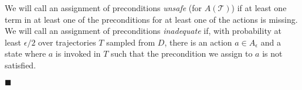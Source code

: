 \documentclass[letterpaper]{article}
\newenvironment{proof}{\noindent{\bf Proof:~~}}{\qed}
\newcommand{\qed}{\hfill\ensuremath{\blacksquare}}
\begin{document}
\begin{proof}


We will call an assignment of preconditions {\em unsafe} (for $A(\mathcal{T})$) if at least one term in at least one of the preconditions for at least one of the actions is missing. We will call an assignment of preconditions {\em inadequate} if, with probability at least $\epsilon/2$ over trajectories $T$ sampled from $D$, there is an action $a\in A_\epsilon$ and a state where $a$ is invoked in $T$ such that the precondition we assign to $a$ is not satisfied. 


\end{proof}
\end{document}
